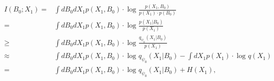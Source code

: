 \begin{align}
\begin{aligned}
I\left ( B_{0}; X_{ 1} \right ) =& \int dB_{0}dX_{ 1} p\left (X_{ 1},B_{0} \right )\cdot \log_{}{\frac{p\left (X_{ 1},B_{0} \right )}{p\left (X_{ 1}\right )\cdot p\left (B_{0}\right )} } \\=& \int dB_{0}dX_{ 1} p\left (X_{ 1},B_{0} \right )\cdot \log_{}{\frac{p\left (X_{ 1}|B_{0} \right )}{ p\left (X_{ 1}\right )} } \\ \geq & \int dB_{0}dX_{ 1} p\left (X_{ 1},B_{0} \right )\cdot \log_{}{\frac{q_{\psi _{0} } \left (X_{ 1}|B_{0} \right )}{ p\left (X_{ 1}\right )} } \\\approx& \int dB_{0}dX_{ 1} p\left (X_{ 1},B_{0} \right )\cdot \log_{}{q_{\psi _{0} }\left (X_{ 1}|B_{0} \right ) } - \int dX_{ 1} p\left (X_{ 1} \right )\cdot \log_{}{q\left (X_{ 1}\right ) } \\ = & \int dB_{0}dX_{ 1} p\left (X_{ 1},B_{0} \right )\cdot \log_{}{q_{\psi _{0} }\left (X_{ 1}|B_{0} \right ) } + H\left (X_{ 1} \right ),
\end{aligned}
\label{lossfunc2}
\end{align}